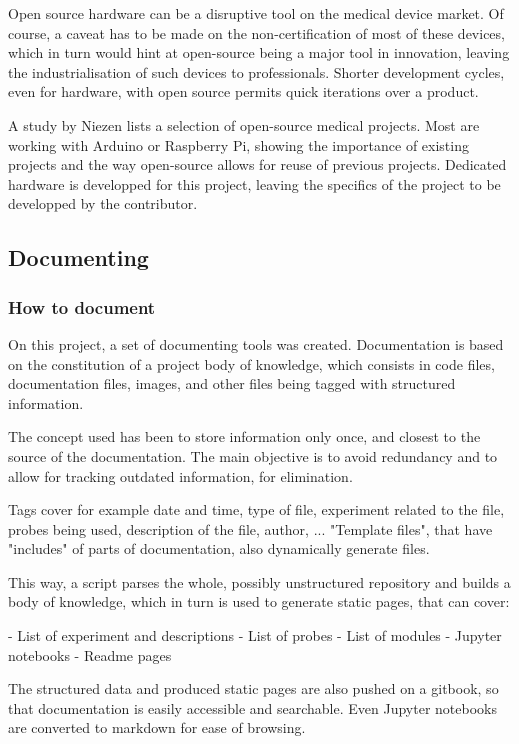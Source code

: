 \documentclass[conference]{IEEEtran}
\begin{document}
\cite{niezen_open-source_2016}


Open source hardware can be a disruptive tool on the medical device market. Of course, a caveat has to be made on the non-certification of most of these devices, which in turn would hint at open-source being a major tool in innovation, leaving the industrialisation of such devices to professionals. Shorter development cycles, even for hardware, with open source permits quick iterations over a product.


A study by Niezen \cite{niezen_open-source_2016} lists a selection of open-source medical projects. Most are working with Arduino or Raspberry Pi, showing the importance of existing projects and the way open-source allows for reuse of previous projects. Dedicated hardware is developped for this project, leaving the specifics of the project to be developped by the contributor.

\subsection{Documenting}

\subsubsection{How to document}

On this project, a set of documenting tools was created. Documentation is based on the constitution of a project body of knowledge, which consists in code files, documentation files, images, and other files being tagged with structured information.

The concept used has been to store information only once, and closest to the source of the documentation. The main objective is to avoid redundancy and to allow for tracking outdated information, for elimination.

Tags cover for example date and time, type of file, experiment related to the file, probes being used, description of the file, author, ...  "Template files", that have "includes" of parts of documentation, also dynamically generate files.

This way, a script parses the whole, possibly unstructured repository and builds a body of knowledge, which in turn is used to generate static pages, that can cover:

- List of experiment and descriptions
- List of probes
- List of modules
- Jupyter notebooks
- Readme pages

The structured data and produced static pages are also pushed on a gitbook, so that documentation is easily accessible and searchable. Even Jupyter notebooks are converted to markdown for ease of browsing.
\end{document}

